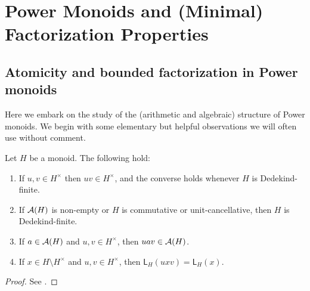\chapter{Power Monoids and (Minimal) Factorization Properties} \label{ch:power monoids}

\section{Atomicity and bounded factorization in Power monoids}
\label{sec:atomicity}
Here we embark on the study of the (arithmetic and algebraic) structure of Power monoids.
We begin with some elementary but helpful observations we will often use without comment.
%
\begin{prop}\label{prop:unit-adjust}
Let $H$ be a monoid.
The following hold:
\begin{enumerate}[label={\rm (\roman{*})}]
	\item\label{it:prop:unit-adjust(0)} If $u, v \in H^\times$ then $uv \in H^\times$, and the converse holds whenever $H$ is Dedekind-finite.
	\item\label{it:prop:unit-adjust(0b)} If $\mathcal{A}(H)$ is non-empty or $H$ is commutative or unit-cancellative, then $H$ is Dedekind-finite.
\item\label{it:prop:unit-adjust(i)} If $a\in \mathcal{A}(H)$ and $u, v \in H^\times$, then $uav\in \mathcal{A}(H)$.
\item\label{it:prop:unit-adjust(ii)} If $x\in H\setminus H^\times$ and $u, v \in H^\times$, then $\mathsf{L}_H(uxv) = \mathsf{L}_H(x)$.
\end{enumerate}
\end{prop}
%
\begin{proof}
See \cite[parts (i), (ii), and (iv) of Lemma 2.2, and Proposition 2.30]{fan-tringali18}.
\end{proof}

